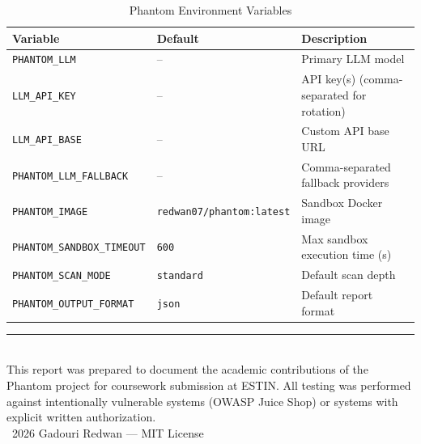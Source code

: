 \documentclass[12pt,a4paper]{article}
\begin{document}
\begin{table}[H]
\centering
\caption{Phantom Environment Variables}
\begin{tabular}{lll}
\toprule
\textbf{Variable} & \textbf{Default} & \textbf{Description} \\
\midrule
\texttt{PHANTOM\_LLM} & -- & Primary LLM model \\
\texttt{LLM\_API\_KEY} & -- & API key(s) (comma-separated for rotation) \\
\texttt{LLM\_API\_BASE} & -- & Custom API base URL \\
\texttt{PHANTOM\_LLM\_FALLBACK} & -- & Comma-separated fallback providers \\
\texttt{PHANTOM\_IMAGE} & \texttt{redwan07/phantom:latest} & Sandbox Docker image \\
\texttt{PHANTOM\_SANDBOX\_TIMEOUT} & \texttt{600} & Max sandbox execution time (s) \\
\texttt{PHANTOM\_SCAN\_MODE} & \texttt{standard} & Default scan depth \\
\texttt{PHANTOM\_OUTPUT\_FORMAT} & \texttt{json} & Default report format \\
\bottomrule
\end{tabular}
\end{table}

\vspace{2cm}
\begin{center}
\rule{0.5\linewidth}{0.4pt}\\[0.3cm]
{\small This report was prepared to document the academic contributions of the Phantom project for coursework submission at ESTIN. All testing was performed against intentionally vulnerable systems (OWASP Juice Shop) or systems with explicit written authorization.}\\[0.3cm]
\textcopyright~2026 Gadouri Redwan --- MIT License
\end{center}
\end{document}
